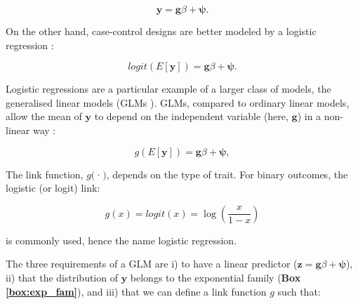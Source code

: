 \begin{equation}\label{eq:Linear_regression_genetics}
 \mathbf{y} = \mathbf{g}\beta + \boldsymbol{\psi}. 
\end{equation}

\newpage

On the other hand, case-control designs are better modeled by a logistic regression \cite{chen2001general,clayton2013statistical}:

\begin{equation}\label{eq:Logistic_regression_genetics}
    logit(E[\mathbf{y}]) = \mathbf{g}\beta + \boldsymbol{\psi}.
\end{equation}



Logistic regressions are a particular example of a larger class of models, the generalised linear models (GLMs \cite{mccullagh2018generalized}). 
GLMs, compared to ordinary linear models, allow the mean of $\mathbf{y}$ to depend on the independent variable (here, $\mathbf{g}$) in a non-linear way \cite{laird2010fundamentals}:

\begin{equation}
 g(E[\mathbf{y}]) = \mathbf{g}\beta + \boldsymbol{\psi}, 
\end{equation}

The link function, $g($·$)$, depends on the type of trait. 
For binary outcomes, the logistic (or logit) link:

\begin{equation}
    g(x) = logit(x) = \log(\frac{x}{1-x})
\end{equation}

is commonly used, hence the name logistic regression.

The three requirements of a GLM are i) to have a linear predictor ($\mathbf{z} = \mathbf{g}\beta + \boldsymbol{\psi}$), ii) that the distribution of $\mathbf{y}$  belongs to the exponential family (\textbf{Box \ref{box:exp_fam}}), and iii) that we can define a link function $g$ such that:

